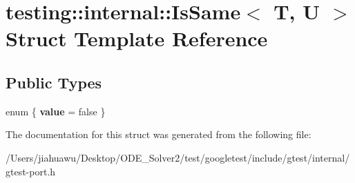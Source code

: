 \hypertarget{structtesting_1_1internal_1_1_is_same}{}\section{testing\+:\+:internal\+:\+:Is\+Same$<$ T, U $>$ Struct Template Reference}
\label{structtesting_1_1internal_1_1_is_same}
\subsection*{Public Types}
\begin{DoxyCompactItemize}
\item 
\mbox{\label{structtesting_1_1internal_1_1_is_same_acebf1dabd866eb05f295125a4991d9ba}} 
enum \{ {\bfseries value} = false
 \}
\end{DoxyCompactItemize}


The documentation for this struct was generated from the following file\+:\begin{DoxyCompactItemize}
\item 
/\+Users/jiahuawu/\+Desktop/\+O\+D\+E\+\_\+\+Solver2/test/googletest/include/gtest/internal/gtest-\/port.\+h\end{DoxyCompactItemize}
